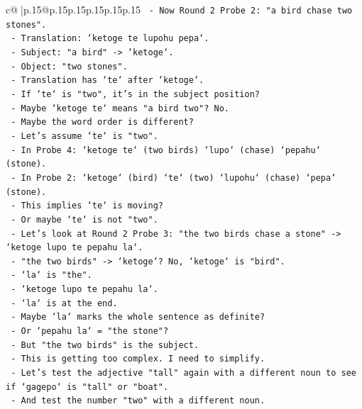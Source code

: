 \documentclass{article}
\begin{document}
{\begin{supertabular}{c@{$\;$}|p{.15\linewidth}@{}p{.15\linewidth}p{.15\linewidth}p{.15\linewidth}p{.15\linewidth}p{.15\linewidth}}
{{{\texttt{            {-} Now Round 2 Probe 2: "a bird chase two stones".} \\
\texttt{            {-} Translation: `ketoge te lupohu pepa`.} \\
\texttt{            {-} Subject: "a bird" {-}> `ketoge`.} \\
\texttt{            {-} Object: "two stones".} \\
\texttt{            {-} Translation has `te` after `ketoge`.} \\
\texttt{            {-} If `te` is "two", it's in the subject position?} \\
\texttt{            {-} Maybe `ketoge te` means "a bird two"? No.} \\
\texttt{            {-} Maybe the word order is different?} \\
\texttt{            {-} Let's assume `te` is "two".} \\
\texttt{            {-} In Probe 4: `ketoge te` (two birds) `lupo` (chase) `pepahu` (stone).} \\
\texttt{            {-} In Probe 2: `ketoge` (bird) `te` (two) `lupohu` (chase) `pepa` (stone).} \\
\texttt{            {-} This implies `te` is moving?} \\
\texttt{            {-} Or maybe `te` is not "two".} \\
\texttt{            {-} Let's look at Round 2 Probe 3: "the two birds chase a stone" {-}> `ketoge lupo te pepahu la`.} \\
\texttt{            {-} "the two birds" {-}> `ketoge`? No, `ketoge` is "bird".} \\
\texttt{            {-} `la` is "the".} \\
\texttt{            {-} `ketoge lupo te pepahu la`.} \\
\texttt{            {-} `la` is at the end.} \\
\texttt{            {-} Maybe `la` marks the whole sentence as definite?} \\
\texttt{            {-} Or `pepahu la` = "the stone"?} \\
\texttt{            {-} But "the two birds" is the subject.} \\
\texttt{            {-} This is getting too complex. I need to simplify.} \\
\texttt{            {-} Let's test the adjective "tall" again with a different noun to see if `gagepo` is "tall" or "boat".} \\
\texttt{            {-} And test the number "two" with a different noun.} \\
}}}
\end{supertabular}}
\end{document}
